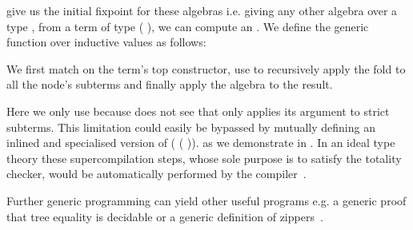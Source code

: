  give us the initial fixpoint for these algebras i.e.
giving any other algebra over a type , from a term of
type ( ), we can compute an .
%
We define the generic  function over inductive values
as follows:


We first match on the term's top constructor, use 
to recursively apply the fold to all the node's subterms and finally
apply the algebra to the result.

Here we only use \assertTotal{} because \idris{} does not see that
 only applies its argument to strict subterms.
This limitation could easily be bypassed by mutually defining
an inlined and specialised version of
( \IdrisKeyword{\KatlaUnderscore} ( )).
as we demonstrate in .
%
In an ideal type theory these supercompilation steps, whose sole
purpose is to satisfy the totality checker, would be automatically
performed by the compiler~\cite{MANUAL:phd/dublin/Mendel12}.


Further generic programming can yield other useful programs e.g. a
generic proof that tree equality is decidable or a generic definition
of zippers~\cite{DBLP:conf/icfp/LohM11}.

